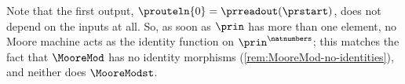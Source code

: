 \begin{example}
    Note that the first output, $\prouteln{0} = \prreadout(\prstart)$, does not depend on the inputs at all.
    So, as soon as $\prin$ has more than one element, no Moore machine acts as the identity function on $\prin^{\natnumbers}$; this matches the fact that $\MooreMod$ has no identity morphisms (\cref{rem:MooreMod-no-identities}), and neither does $\MooreModst$.
\end{example}



